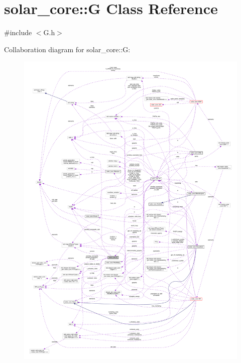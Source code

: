 \hypertarget{classsolar__core_1_1_g}{}\section{solar\+\_\+core\+:\+:G Class Reference}
\label{classsolar__core_1_1_g}


{\ttfamily \#include $<$G.\+h$>$}



Collaboration diagram for solar\+\_\+core\+:\+:G\+:
\nopagebreak
\begin{figure}[H]
\begin{center}
\leavevmode
\includegraphics[width=350pt]{classsolar__core_1_1_g__coll__graph}
\end{center}
\end{figure}

